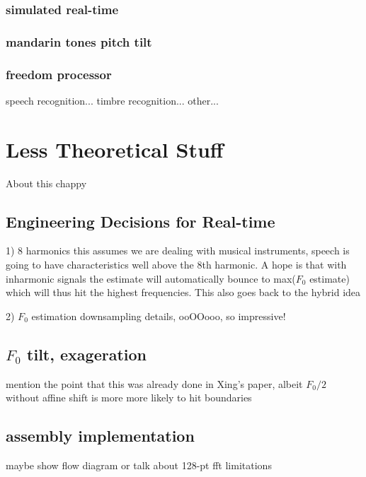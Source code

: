 \documentclass [11pt, proquest] {uwthesis}[2015/03/03]
\begin{document}
    \subsection{simulated real-time}
    
    \subsection{mandarin tones pitch tilt}
    
    \subsection{freedom processor}
        speech recognition...
        timbre recognition...
        other...


 
\chapter{Less Theoretical Stuff}

About this chappy

\section{Engineering Decisions for Real-time}

1) 8 harmonics
this assumes we are dealing with musical instruments, speech is going to have characteristics well above the 8th harmonic.  A hope is that with inharmonic signals the estimate will automatically bounce to max($F_0$ estimate) which will thus hit the highest frequencies.  This also goes back to the hybrid idea


2) $F_0$ estimation downsampling details, ooOOooo, so impressive!

\section{$F_0$ tilt, exageration}

mention the point that this was already done in Xing's paper, albeit $F_0/2$ without affine shift is more more likely to hit boundaries 

\section{assembly implementation}

maybe show flow diagram or talk about 128-pt fft limitations
\end{document}
